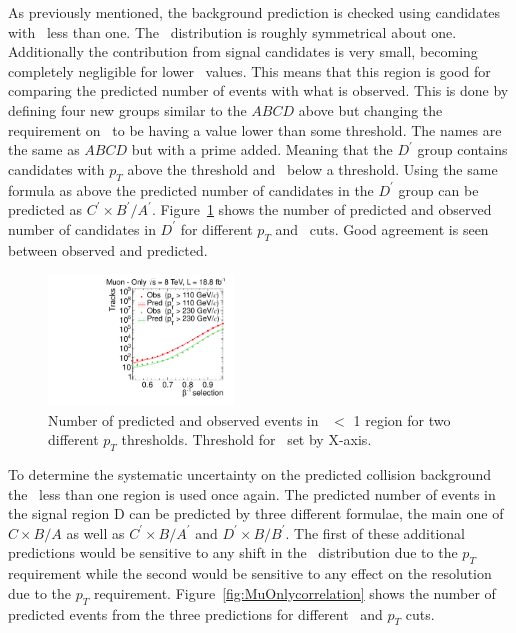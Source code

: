 As previously mentioned, the background prediction is checked using candidates with \invbeta\ less than one. The \invbeta\ distribution is roughly symmetrical about one. 
Additionally the contribution from signal candidates is very small, becoming completely negligible for lower \invbeta\ values. This means that this region is good for comparing 
the predicted number of events with what is observed. This is done by defining four new groups similar to the $ABCD$ above but changing the requirement on \invbeta\ to be having
a value lower than some threshold. The names are the same as $ABCD$ but with a prime added. Meaning that the $D^{\prime}$ group contains candidates with $p_T$ above
the threshold and \invbeta\ below a threshold. Using the same formula as above the predicted number of candidates in the $D^{\prime}$ group can be predicted as
$C^{\prime} \times B^{\prime}/A^{\prime}$. Figure~\ref{fig:PredFlipPt230} shows the number of predicted and observed number of candidates in $D^{\prime}$  for different $p_T$
and \invbeta\ cuts. Good agreement is seen between observed and predicted.

\begin{figure}
\centering
  \includegraphics[clip=true, trim=0.0cm 0cm 2.8cm 0cm, width=0.44\textwidth]{figures/muonly/Prediction_Data8TeV_NPredVsNObs_Flip}
  \caption{Number of predicted and observed events in \invbeta\ $<$ 1 region for two different $p_T$ thresholds. Threshold for \invbeta\ set by X-axis.
    \label{fig:PredFlipPt230}}
\end{figure}

To determine the systematic uncertainty on the predicted collision background the \invbeta\ less than one region is used once again. The predicted number of events
in the signal region D can be predicted by three different formulae, the main one of $C \times B/A$ as well as 
$C^{\prime} \times B/A^{\prime}$ and $D^{\prime} \times B/B^{\prime}$.
The first of these additional predictions would be sensitive to any shift in the \invbeta\ distribution due to the $p_T$ requirement while the second would be
sensitive to any effect on the resolution due to the $p_T$ requirement. Figure~\ref{fig:MuOnlycorrelation} shows the number of predicted events from the three predictions
for different \invbeta\ and $p_T$ cuts.


